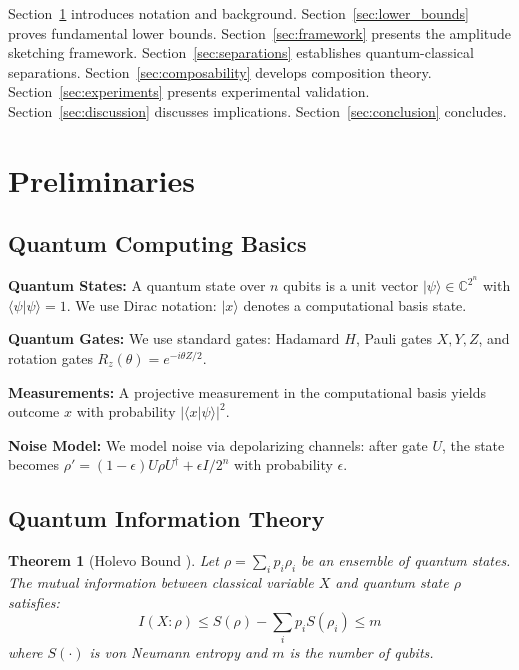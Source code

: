 \documentclass[11pt,letterpaper]{article}
\newtheorem{theorem}{Theorem}
\begin{document}
Section~\ref{sec:preliminaries} introduces notation and background. Section~\ref{sec:lower_bounds} proves fundamental lower bounds. Section~\ref{sec:framework} presents the amplitude sketching framework. Section~\ref{sec:separations} establishes quantum-classical separations. Section~\ref{sec:composability} develops composition theory. Section~\ref{sec:experiments} presents experimental validation. Section~\ref{sec:discussion} discusses implications. Section~\ref{sec:conclusion} concludes.

\section{Preliminaries}
\label{sec:preliminaries}

\subsection{Quantum Computing Basics}

\textbf{Quantum States:} A quantum state over $n$ qubits is a unit vector $|\psi\rangle \in \mathbb{C}^{2^n}$ with $\langle \psi | \psi \rangle = 1$. We use Dirac notation: $|x\rangle$ denotes a computational basis state.

\textbf{Quantum Gates:} We use standard gates: Hadamard $H$, Pauli gates $X, Y, Z$, and rotation gates $R_z(\theta) = e^{-i\theta Z/2}$.

\textbf{Measurements:} A projective measurement in the computational basis yields outcome $x$ with probability $|\langle x | \psi \rangle|^2$.

\textbf{Noise Model:} We model noise via depolarizing channels: after gate $U$, the state becomes $\rho' = (1-\epsilon)U\rho U^\dagger + \epsilon I/2^n$ with probability $\epsilon$.

\subsection{Quantum Information Theory}

\begin{theorem}[Holevo Bound \cite{holevo1973bounds}]
\label{thm:holevo}
Let $\rho = \sum_i p_i \rho_i$ be an ensemble of quantum states. The mutual information between classical variable $X$ and quantum state $\rho$ satisfies:
\begin{equation}
I(X : \rho) \leq S(\rho) - \sum_i p_i S(\rho_i) \leq m
\end{equation}
where $S(\cdot)$ is von Neumann entropy and $m$ is the number of qubits.
\end{theorem}
\end{document}
